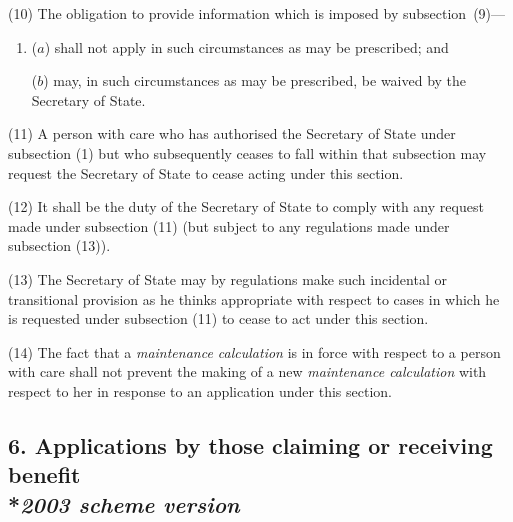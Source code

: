 \documentclass[12pt,a4paper]{article}
\begin{document}
(10) The obligation to provide information which is imposed by subsection~(9)—
\begin{enumerate}\item[]
($a$) shall not apply in such circumstances as may be prescribed; and

($b$) may, in such circumstances as may be prescribed, be waived by the Secretary of State.
\end{enumerate}

(11) A person with care who has authorised the Secretary of State under subsection (1)  but who subsequently ceases to fall within that subsection may request the Secretary of State to cease acting under this section.

(12) It shall be the duty of the Secretary of State to comply with any request made under subsection (11)  (but subject to any regulations made under subsection (13)).

(13) The Secretary of State may by regulations make such incidental or transitional provision as he thinks appropriate with respect to cases in which he is requested under subsection (11)  to cease to act under this section.

(14) The fact that a 
\emph{maintenance calculation}  %
is in force with respect to a person with care shall not prevent the making of a new 
\emph{maintenance calculation}  %
with respect to her in response to an application under this section.


\subsection[6. Applications by those claiming or receiving benefit --- \emph{2003 scheme version}]{6. Applications by those claiming or receiving benefit\\*\emph{2003 scheme version}}
\end{document}
